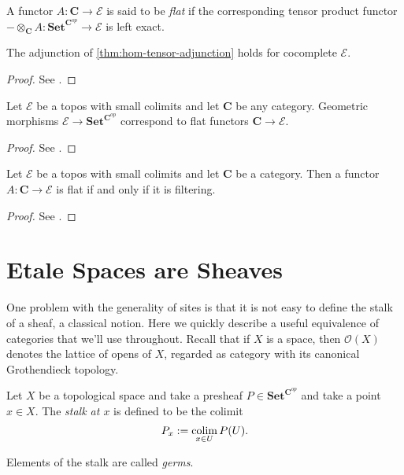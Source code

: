 \begin{definition}
\label{def:flat functor for cocomplete E}
A functor $A : \mathbf{C} \to \mathscr{E}$ is said to be \emph{flat} if the corresponding tensor product functor $- \otimes_{\mathbf{C}} A : \mathbf{Set}^{\mathbf{C}^{op}} \to \mathscr{E}$ is left exact.
\end{definition}

\begin{theorem}
\label{thm:the adjunction holds for cocomplete E}
The adjunction of \cref{thm:hom-tensor-adjunction} holds for cocomplete $\mathscr{E}$.
\end{theorem}
\begin{proof}
See \cite[Theorem VII.2.1bis]{MacLaneMoerdijk91}.
\end{proof}

\begin{theorem}
\label{thm:geometric morphisms correpsond to flat functors to E}
Let $\mathscr{E}$ be a topos with small colimits and let $\mathbf{C}$ be any category. Geometric morphisms $\mathscr{E} \to \mathbf{Set}^{\mathbf{C}^{op}}$ correspond to flat functors $\mathbf{C} \to \mathscr{E}$.
\end{theorem}
\begin{proof}
See \cite[Theorem VII.7.2]{MacLaneMoerdijk91}.
\end{proof}

\begin{theorem}
\label{thm:flat iff filtering}
Let $\mathscr{E}$ be a topos with small colimits and let $\mathbf{C}$ be a category. Then a functor $A : \mathbf{C} \to \mathscr{E}$ is flat if and only if it is filtering. 
\end{theorem}
\begin{proof}
See \cite[Theorem VII.9.1]{MacLaneMoerdijk91}.
\end{proof}

\section{Etale Spaces are Sheaves}
One problem with the generality of sites is that it is not easy to define the stalk of a sheaf, a classical notion.
Here we quickly describe a useful equivalence of categories that we'll use throughout. Recall that if $X$ is a space, then $\mathcal{O}(X)$ denotes the lattice of opens of $X$, regarded as category with its canonical Grothendieck topology.

\begin{definition}
\label{def:stalk of a sheaf}
Let $X$ be a topological space and take a presheaf $P \in \mathbf{Set}^{\mathbf{C}^{op}}$ and take a point $x \in X$. The \emph{stalk at $x$}  is defined to be the colimit
\[ P_x := \operatorname*{colim}_{x \in U} P(U). \]
\end{definition}
Elements of the stalk are called \emph{germs}. 

